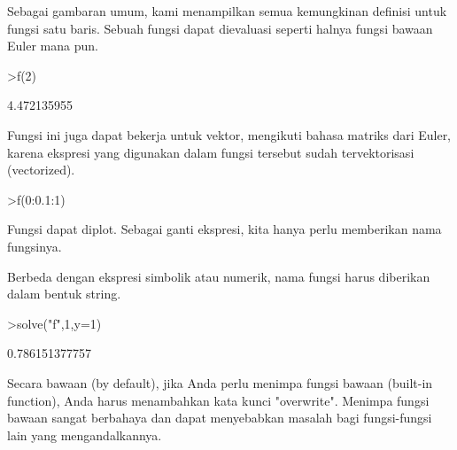 \documentclass{article}
\newenvironment{eulernotebook}{\par}{\par}
\newenvironment{eulercomment}{\par\medskip}{\par\medskip}
\begin{document}
\begin{eulernotebook}
\begin{eulercomment}
\begin{eulercomment}
\begin{eulerprompt}
\end{eulerprompt}
\begin{eulercomment}
Sebagai gambaran umum, kami menampilkan semua kemungkinan definisi
untuk fungsi satu baris. Sebuah fungsi dapat dievaluasi seperti halnya
fungsi bawaan Euler mana pun.
\end{eulercomment}
\begin{eulerprompt}
>f(2)
\end{eulerprompt}
\begin{euleroutput}
  4.472135955
\end{euleroutput}
\begin{eulercomment}
Fungsi ini juga dapat bekerja untuk vektor, mengikuti bahasa matriks
dari Euler, karena ekspresi yang digunakan dalam fungsi tersebut sudah
tervektorisasi (vectorized).
\end{eulercomment}
\begin{eulerprompt}
>f(0:0.1:1)
\end{eulerprompt}
\begin{euleroutput}
  [0,  0.100499,  0.203961,  0.313209,  0.430813,  0.559017,  0.699714,
  0.854459,  1.0245,  1.21083,  1.41421]
\end{euleroutput}
\begin{eulercomment}
Fungsi dapat diplot. Sebagai ganti ekspresi, kita hanya perlu
memberikan nama fungsinya.

Berbeda dengan ekspresi simbolik atau numerik, nama fungsi harus
diberikan dalam bentuk string.
\end{eulercomment}
\begin{eulerprompt}
>solve("f",1,y=1)
\end{eulerprompt}
\begin{euleroutput}
  0.786151377757
\end{euleroutput}
\begin{eulercomment}
Secara bawaan (by default), jika Anda perlu menimpa fungsi bawaan
(built-in function), Anda harus menambahkan kata kunci "overwrite".
Menimpa fungsi bawaan sangat berbahaya dan dapat menyebabkan masalah
bagi fungsi-fungsi lain yang mengandalkannya.


\end{eulercomment}
\end{eulercomment}
\end{eulercomment}
\end{eulernotebook}
\end{document}
